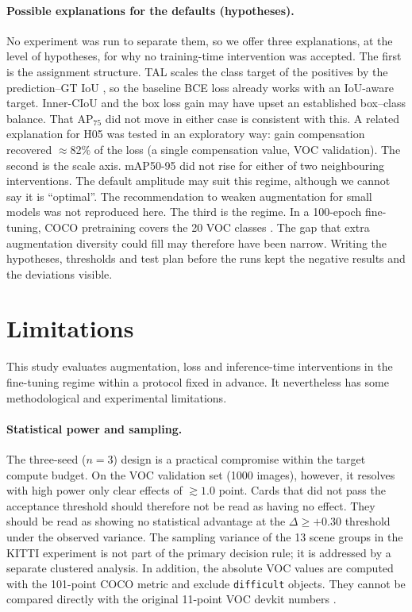 \documentclass[pdflatex,iicol,sn-mathphys-num]{sn-jnl}
\begin{document}
\paragraph{Possible explanations for the defaults (hypotheses).}
No experiment was run to separate them, so we offer three explanations, at the level of hypotheses, for why no training-time intervention was accepted. The first is the assignment structure. TAL scales the class target of the positives by the prediction--GT IoU \cite{feng_2021_tood}, so the baseline BCE loss already works with an IoU-aware target. Inner-CIoU and the box loss gain may have upset an established box--class balance. That AP$_{75}$ did not move in either case is consistent with this. A related explanation for H05 was tested in an exploratory way: gain compensation recovered $\approx$82\% of the loss (a single compensation value, VOC validation). The second is the scale axis. mAP50-95 did not rise for either of two neighbouring interventions. The default amplitude may suit this regime, although we cannot say it is ``optimal''. The recommendation to weaken augmentation for small models \cite{ge_2021_yolox} was not reproduced here. The third is the regime. In a 100-epoch fine-tuning, COCO pretraining covers the 20 VOC classes \cite{lin_2014_coco}. The gap that extra augmentation diversity could fill may therefore have been narrow. Writing the hypotheses, thresholds and test plan before the runs \cite{nosek_2018_preregistration} kept the negative results and the deviations visible.

\section{Limitations}\label{sec:sinirliliklar}

This study evaluates augmentation, loss and inference-time interventions in the fine-tuning regime within a protocol fixed in advance. It nevertheless has some methodological and experimental limitations.

\paragraph{Statistical power and sampling.}
The three-seed ($n=3$) design is a practical compromise within the target compute budget. On the VOC validation set (1000 images), however, it resolves with high power only clear effects of $\gtrsim 1.0$ point. Cards that did not pass the acceptance threshold should therefore not be read as having no effect. They should be read as showing no statistical advantage at the $\Delta \ge +0.30$ threshold under the observed variance. The sampling variance of the 13 scene groups in the KITTI experiment is not part of the primary decision rule; it is addressed by a separate clustered analysis. In addition, the absolute VOC values are computed with the 101-point COCO metric and exclude \texttt{difficult} objects. They cannot be compared directly with the original 11-point VOC devkit numbers \cite{everingham_2010_voc}.
\end{document}
